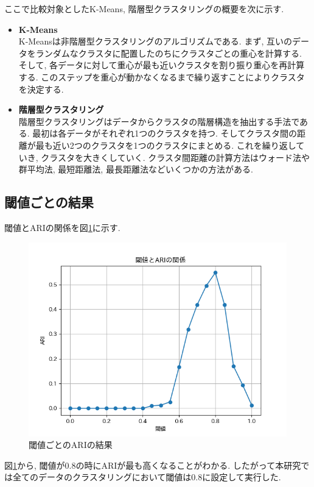 ここで比較対象としたK-Means, 階層型クラスタリングの概要を次に示す. 

\begin{itemize}
  \item \textbf{K-Means}\\
  K-Meansは非階層型クラスタリングのアルゴリズムである. まず, 互いのデータをランダムなクラスタに配置したのちにクラスタごとの重心を計算する. そして, 各データに対して重心が最も近いクラスタを割り振り重心を再計算する. このステップを重心が動かなくなるまで繰り返すことによりクラスタを決定する. 

  \item \textbf{階層型クラスタリング}\\
  階層型クラスタリングはデータからクラスタの階層構造を抽出する手法である. 最初は各データがそれぞれ1つのクラスタを持つ. そしてクラスタ間の距離が最も近い2つのクラスタを1つのクラスタにまとめる. これを繰り返していき, クラスタを大きくしていく. クラスタ間距離の計算方法はウォード法や群平均法, 最短距離法, 最長距離法などいくつかの方法がある. 
\end{itemize}

\subsection{閾値ごとの結果}
閾値とARIの関係を図\ref{fig:cw_graph}に示す.

\begin{figure}[H]
  \centering
  \includegraphics[scale=0.8]
    {contents/images/cw_graph.png}
  \caption{閾値ごとのARIの結果\label{fig:cw_graph}}
\end{figure}
図\ref{fig:cw_graph}から, 閾値が0.8の時にARIが最も高くなることがわかる. したがって本研究では全てのデータのクラスタリングにおいて閾値は0.8に設定して実行した.

